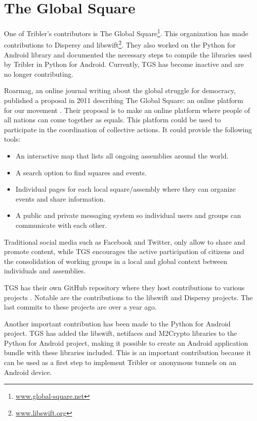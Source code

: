 \section{The Global Square}
	\label{sec:tgs}
	One of Tribler's contributors is The Global Square\footnote{\href{http://www.global-square.net/}{www.global-square.net}}. This organization has made contributions to Dispersy and libswift\footnote{\href{http://libswift.org/}{www.libswift.org}}. They also worked on the Python for Android library and documented the necessary steps to compile the libraries used by Tribler in Python for Android. Currently, TGS has become inactive and are no longer contributing.
	
	Roarmag, an online journal writing about the global struggle for democracy, published a proposal in 2011 describing The Global Square: an online platform for our movement \cite{theglobalsquare}. Their proposal is to make an online platform where people of all nations can come together as equals. This platform could be used to participate in the coordination of collective actions. It could provide the following tools:
	\begin{itemize}
		\item An interactive map that lists all ongoing assemblies around the world.
		\item A search option to find squares and events.
		\item Individual pages for each local square/assembly where they can organize events and share information.
		\item A public and private messaging system so individual users and groups can communicate with each other.
	\end{itemize}
	Traditional social media such as Facebook and Twitter, only allow to share and promote content, while TGS encourages the active participation of citizens and the consolidation of working groups in a local and global context between individuals and assemblies.
	
	TGS has their own GitHub repository where they host contributions to various projects \cite{theglobalsquaregithub}. Notable are the contributions to the libswift and Dispersy projects. The last commits to these projects are over a year ago.
		
	Another important contribution has been made to the Python for Android project. TGS has added the libswift, netifaces and M2Crypto libraries to the Python for Android project, making it possible to create an Android application bundle with these libraries included. This is an important contribution because it can be used as a first step to implement Tribler or anonymous tunnels on an Android device.

